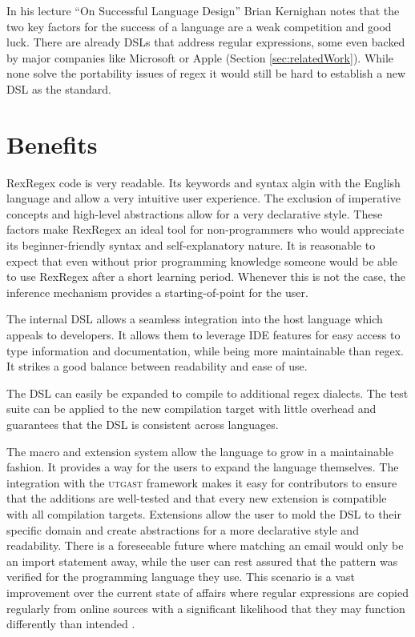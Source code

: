 In his lecture \enquote{On Successful Language Design} \cite{OnSuccessfulLanuageDesignKernighan} Brian Kernighan notes that the two key factors for the success of a language are a weak competition and good luck. There are already DSLs that address regular expressions, some even backed by major companies like Microsoft or Apple (Section \ref{sec:relatedWork}). While none solve the portability issues of regex it would still be hard to establish a new DSL as the standard.

\section{Benefits}
 
RexRegex code is very readable. Its keywords and syntax algin with the English language and allow a very intuitive user experience. The exclusion of imperative concepts and high-level abstractions allow for a very declarative style. These factors make RexRegex an ideal tool for non-programmers who would appreciate its beginner-friendly syntax and self-explanatory nature. It is reasonable to expect that even without prior programming knowledge someone would be able to use RexRegex after a short learning period. Whenever this is not the case, the inference mechanism provides a starting-of-point for the user.

The internal DSL allows a seamless integration into the host language which appeals to developers. It allows them to leverage IDE features for easy access to type information and documentation, while being more maintainable than regex. It strikes a good balance between readability and ease of use.

The DSL can easily be expanded to compile to additional regex dialects. The test suite can be applied to the new compilation target with little overhead and guarantees that the DSL is consistent across languages.

The macro and extension system allow the language to grow in a maintainable fashion. It provides a way for the users to expand the language themselves. The integration with the \textsc{utgast} framework makes it easy for contributors to ensure that the additions are well-tested and that every new extension is compatible with all compilation targets. Extensions allow the user to mold the DSL to their specific domain and create abstractions for a more declarative style and readability. There is a foreseeable future where matching an email would only be an import statement away, while the user can rest assured that the pattern was verified for the programming language they use. This scenario is a vast improvement over the current state of affairs where regular expressions are copied regularly from online sources with a significant likelihood that they may function differently than intended \cite{RegexNotLinguaFranca}.

